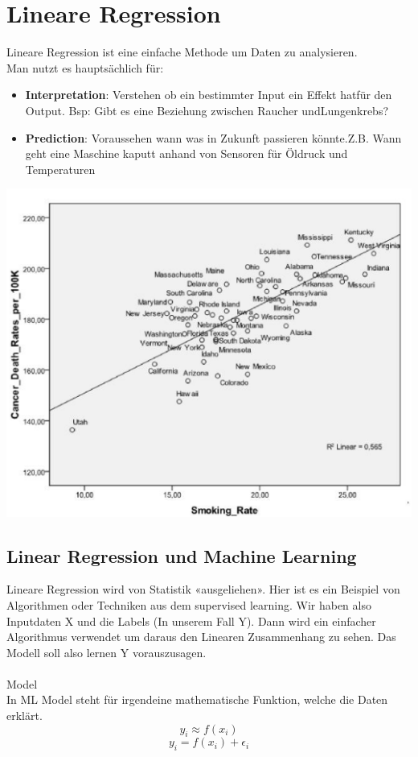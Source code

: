 \section{Lineare Regression}
Lineare Regression ist eine einfache Methode um Daten zu analysieren.\\
Man nutzt es hauptsächlich für:
\begin{itemize}
\item \textbf{Interpretation}: Verstehen ob ein bestimmter Input ein Effekt hatfür den Output. Bsp: Gibt es eine Beziehung zwischen Raucher undLungenkrebs?
\item \textbf{Prediction}: Voraussehen wann was in Zukunft passieren könnte.Z.B. Wann geht eine Maschine kaputt anhand von Sensoren für Öldruck und Temperaturen
\end{itemize}
\includegraphics[width=\linewidth]{img/linear_regression.png}
\subsection{Linear Regression und Machine Learning}
Lineare Regression wird von Statistik «ausgeliehen». Hier ist es ein Beispiel von Algorithmen oder Techniken aus dem supervised learning. Wir haben also Inputdaten X und die Labels (In unserem Fall Y). Dann wird ein einfacher Algorithmus verwendet um daraus den Linearen Zusammenhang zu sehen. Das Modell soll also lernen Y vorauszusagen.\\
\\
\textcolor{myblue}{Model}\\
In ML Model steht für irgendeine mathematische Funktion, welche die Daten erklärt.
$$y_i \approx f(x_i)$$
$$y_i = f(x_i) + \epsilon_i$$

